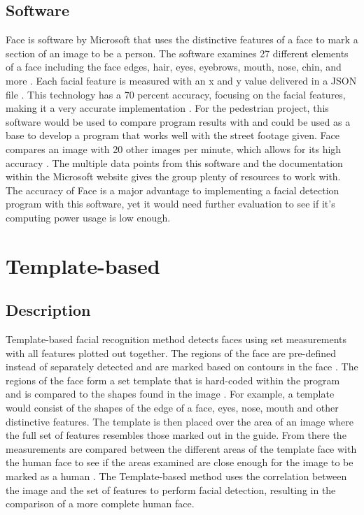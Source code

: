 \documentclass[onecolumn, draftclsnofoot,10pt, compsoc]{IEEEtran}
\begin{document}
\subsection{Software}
Face is software by Microsoft that uses the distinctive features of a face to mark a section of an image to be a person. The software examines 27 different elements of a face including the face edges, hair, eyes, eyebrows, mouth, nose, chin, and more \cite{Microsoft}. Each facial feature is measured with an x and y value delivered in a JSON file \cite{Microsoft}. This technology has a 70 percent accuracy, focusing on the facial features, making it a very accurate implementation \cite{Microsoft}. For the pedestrian project, this software would be used to compare program results with and could be used as a base to develop a program that works well with the street footage given. Face compares an image with 20 other images per minute, which allows for its high accuracy \cite{Microsoft}. The multiple data points from this software and the documentation within the Microsoft website gives the group plenty of resources to work with. The accuracy of Face is a major advantage to implementing a facial detection program with this software, yet it would need further evaluation to see if it's computing power usage is low enough.


\section{Template-based}

\subsection{Description}
Template-based facial recognition method detects faces using set measurements with all features plotted out together. The regions of the face are pre-defined instead of separately detected and are marked based on contours in the face \cite{Detection}. The regions of the face form a set template that is hard-coded within the program and is compared to the shapes found in the image \cite{Medium}. For example, a template would consist of the shapes of the edge of a face, eyes, nose, mouth and other distinctive features. The template is then placed over the area of an image where the full set of features resembles those marked out in the guide. From there the measurements are compared between the different areas of the template face with the human face to see if the areas examined are close enough for the image to be marked as a human \cite{Medium}. The Template-based method uses the correlation between the image and the set of features to perform facial detection, resulting in the comparison of a more complete human face.
\end{document}
